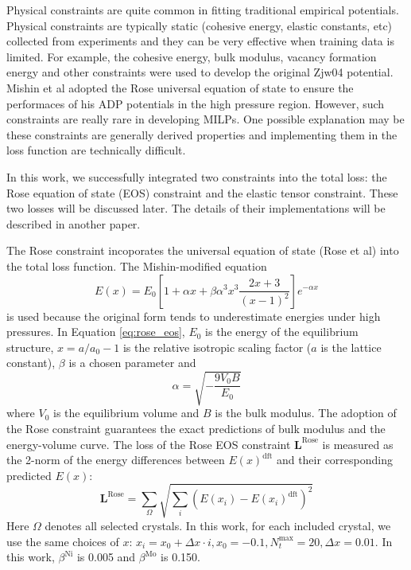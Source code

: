 \documentclass[prb,reprint]{revtex4-2}
\begin{document}
Physical constraints are quite common in fitting traditional empirical 
potentials. Physical constraints are typically static (cohesive energy, elastic 
constants, etc) collected from experiments and they can be very effective when 
training data is limited. For example, the cohesive energy, bulk modulus, 
vacancy formation energy and other constraints were used to develop the original 
Zjw04 potential. Mishin et al adopted the Rose universal equation of state to 
ensure the performaces of his ADP potentials in the high pressure region. 
However, such constraints are really rare in developing MILPs. One possible 
explanation may be these constraints are generally derived properties and 
implementing them in the loss function are technically difficult.

In this work, we successfully integrated two constraints into the total loss:
the Rose equation of state (EOS) \cite{Rose0,Rose1,Rose2} constraint and the 
elastic tensor constraint. These two losses will be discussed later. The details 
of their implementations will be described in another paper.

The Rose constraint incoporates the universal equation of state (Rose et al) 
into the total loss function. The Mishin-modified equation 
\begin{equation}
\label{eq:rose_eos}
E(x) = E_{0}\left[
    1 + \alpha x + \beta \alpha^3 x^3 \frac{2x + 3}{(x - 1)^2} \right]
    e^{-\alpha x}
\end{equation}
is used because the original form tends to underestimate energies under high 
pressures. In Equation \ref{eq:rose_eos}, $E_{0}$ is the energy of the 
equilibrium structure, $x = a / a_{0} - 1$ is the relative isotropic scaling 
factor ($a$ is the lattice constant), $\beta$ is a chosen parameter and 
\begin{equation}
\label{eq:rose_alpha}
\alpha = \sqrt{-\frac{9 V_{0} B }{E_{0}}}
\end{equation}
where $V_0$ is the equilibrium volume and $B$ is the bulk modulus. The adoption
of the Rose constraint guarantees the exact predictions of bulk modulus and 
the energy-volume curve. The loss of the Rose EOS constraint 
$\mathbf{L}^{\mathrm{Rose}}$  is measured as the 2-norm of the energy 
differences between $E(x)^{\mathrm{dft}}$ and their corresponding predicted 
$E(x)$: 
\begin{equation}
\label{eq:rose_loss}
\mathbf{L}^{\mathrm{Rose}} = \sum_{\Omega}{
    \sqrt{\sum_{i}{\left(E(x_i) - E(x_i)^{\mathrm{dft}}\right)^2}}
}
\end{equation}
Here $\Omega$ denotes all selected crystals. In this work, for each included 
crystal, we use the same choices of $x$: 
$x_{i} = x_{0} + \Delta x \cdot i, x_{0} = -0.1, N_{t}^{\mathrm{max}} = 20, 
\Delta x=0.01$. In this work, $\beta^{\mathrm{Ni}}$ is 0.005 and 
$\beta^{\mathrm{Mo}}$ is 0.150.
 
\end{document}
